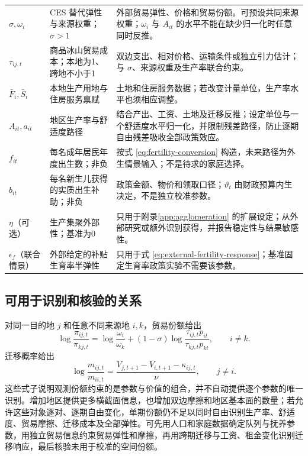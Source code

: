 \documentclass[UTF8,a4paper,zihao=-4,fontset=windows]{ctexart}
\numberwithin{equation}{section}
\begin{document}
\begin{longtable}{L{0.17\textwidth}L{0.35\textwidth}L{0.38\textwidth}}
$\sigma,\omega_i$ & CES 替代弹性与来源权重；$\sigma>1$ & 外部贸易弹性、价格和贸易份额。可预设共同来源权重；$\omega_i$ 与 $A_{it}$ 的水平不能在缺少归一化时任意同时反推。\\
$\tau_{ij,t}$ & 商品冰山贸易成本；本地为1、跨地不小于1 & 双边支出、相对价格、运输条件或独立引力估计；与 $\sigma$、来源权重及生产率联合约束。\\
$\bar F_i,\bar S_i$ & 本地生产用地与住房服务禀赋 & 土地和住房服务数据；若改变计量单位，生产率水平也须相应调整。\\
$A_{it},a_{it}$ & 地区生产率与舒适度路径 & 结合产出、工资、土地及迁移反推；设定单位与一个舒适度水平归一化，并限制残差路径，防止逐期自由残差吸收全部政策效应。\\
$f_{it}$ & 每名成年居民年度出生数；非负 & 按式 \eqref{eq:fertility-conversion} 构造，未来路径为外生情景输入；不是待求的家庭选择。\\
$b_{it}$ & 每名新生儿获得的实质出生补助；非负 & 政策金额、物价和领取口径；$\vartheta_t$ 由财政预算内生决定，不是独立校准参数。\\
$\eta$（可选） & 生产集聚外部性；基准为0 & 只用于附录\ref{app:agglomeration} 的扩展设定；从外部研究或额外识别获得，并报告稳定性与结果敏感性。\\
$\epsilon_f$（联合情景） & 外部给定的补贴生育率半弹性 & 只用于式 \eqref{eq:external-fertility-response}；基准固定生育率政策实验不需要该参数。\\
\end{longtable}
\normalsize

\subsection{可用于识别和核验的关系}
对同一目的地 $j$ 和任意不同来源地 $i,k$，贸易份额给出
\begin{equation}
  \log\frac{\pi_{ij,t}}{\pi_{kj,t}}
   =\log\frac{\omega_i}{\omega_k}
    +(1-\sigma)\log\frac{\tau_{ij,t}p_{it}}{\tau_{kj,t}p_{kt}},
    \qquad i\ne k.
  \label{eq:trade-identification}
\end{equation}
迁移概率给出
\begin{equation}
  \log\frac{m_{ij,t}}{m_{ii,t}}
    =\frac{V_{j,t+1}-V_{i,t+1}-\kappa_{ij,t}}{\nu},
    \qquad j\ne i.
  \label{eq:migration-identification}
\end{equation}
这些式子说明观测份额约束的是参数与价值的组合，并不自动提供逐个参数的唯一识别。增加地区提供更多横截面信息，也增加双边摩擦和地区基本面的数量；若允许这些对象逐对、逐期自由变化，单期份额仍不足以同时自由识别生产率、舒适度、贸易摩擦、迁移成本及全部弹性。可先用人口和家庭数据确定队列与抚养参数，用独立贸易信息约束贸易弹性和摩擦，再用跨期迁移与工资、租金变化识别迁移响应，最后核验未用于校准的空间份额。
\end{document}
